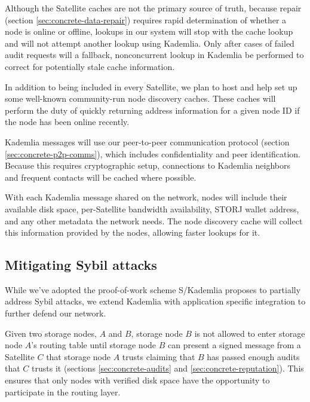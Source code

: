 \documentclass[8pt,fleqn,openany]{book}
\begin{document}
Although the Satellite caches are not the primary source of truth, because repair
(section \ref{sec:concrete-data-repair}) requires rapid determination of
whether a node is online or offline, lookups in our system will stop with the
cache lookup and will not attempt another lookup using Kademlia.
Only after cases of failed audit requests will a fallback, nonconcurrent
lookup in Kademlia
be performed to correct for potentially stale cache information.

In addition to being included in every Satellite,
we plan to host and help set up some well-known community-run node discovery caches.
These caches will perform the duty of quickly returning address information
for a given node ID if the node has been online recently.

Kademlia messages will use our peer-to-peer communication protocol (section
\ref{sec:concrete-p2p-comms}), which includes confidentiality and peer
identification. Because this requires cryptographic setup, connections to
Kademlia neighbors and frequent contacts will be cached where possible.

With each Kademlia message shared on the network, nodes will include their
available disk space, per-Satellite bandwidth availability,
STORJ wallet address, and any other metadata the network needs.
The node discovery cache will collect this information provided by the nodes,
allowing faster lookups for it.


\subsection{Mitigating Sybil attacks}\label{sec:concrete-sybil}

While we've adopted the proof-of-work scheme S/Kademlia proposes to partially
address Sybil attacks, we extend Kademlia with application specific integration
to further defend our network.

Given two storage nodes, $A$ and $B$, storage
node $B$ is not allowed to enter storage node $A$'s routing table until storage
node $B$ can present a signed message from a Satellite $C$ that storage node $A$
trusts claiming that $B$ has passed enough audits that $C$ trusts it
(sections \ref{sec:concrete-audits} and \ref{sec:concrete-reputation}).
This ensures that only nodes with verified
disk space have the opportunity to participate in the routing layer.
\end{document}
